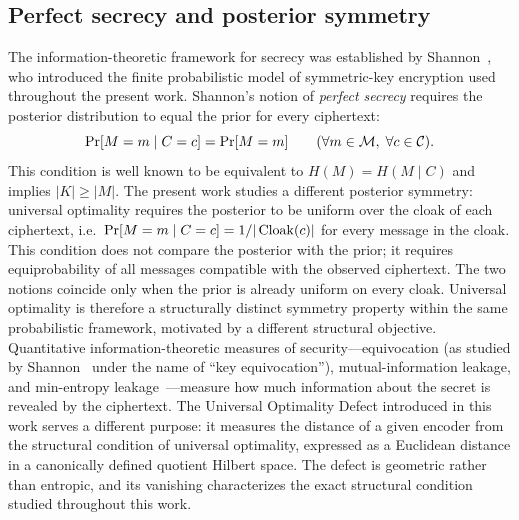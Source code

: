 \subsection*{Perfect secrecy and posterior symmetry}\label{ch:sec:perfect-secrecy-and-posterior-symmetry}
The information-theoretic framework for secrecy was established by
Shannon~\cite{shannon1949}, who introduced the finite probabilistic
model of symmetric-key encryption used throughout the present work.
Shannon's notion of \emph{perfect secrecy} requires the posterior
distribution to equal the prior for every ciphertext:
\[
\Pr[M=m\mid C=c]=\Pr[M=m]
\qquad(\forall m\in\mathcal{M},\; \forall c\in\mathcal{C}).
\]
This condition is well known to be equivalent to
$H(M)=H(M\mid C)$ and implies $|K|\ge|M|$.
The present work studies a different posterior symmetry:
universal optimality requires the posterior to be uniform over the
cloak of each ciphertext, i.e.~$\Pr[M=m\mid C=c]=1/|\operatorname{Cloak}(c)|$
for every message in the cloak.  This condition does not compare the
posterior with the prior; it requires equiprobability of all messages
compatible with the observed ciphertext.  The two notions coincide
only when the prior is already uniform on every cloak.  Universal
optimality is therefore a structurally distinct symmetry property
within the same probabilistic framework, motivated by a different
structural objective.
Quantitative information-theoretic measures of security---equivocation
(as studied by Shannon~\cite{shannon1949} under the name of
``key equivocation''), mutual-information leakage, and min-entropy
leakage~\cite{smith2009foundations}---measure how much information
about the secret is revealed by the ciphertext.  The Universal
Optimality Defect introduced in this work serves a different purpose:
it measures the distance of a given encoder from the structural
condition of universal optimality, expressed as a Euclidean distance
in a canonically defined quotient Hilbert space.  The defect is
geometric rather than entropic, and its vanishing characterizes the
exact structural condition studied throughout this work.
